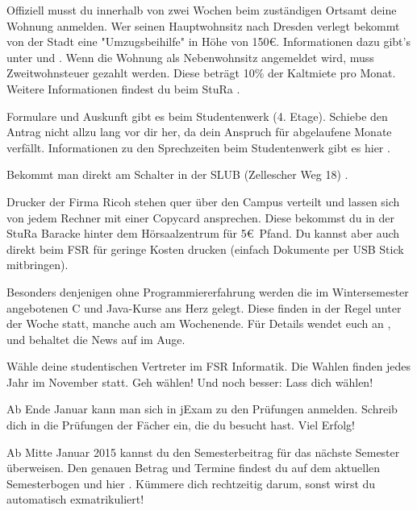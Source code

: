 Offiziell musst du innerhalb von zwei Wochen beim zuständigen Ortsamt  deine Wohnung anmelden.
Wer seinen Hauptwohnsitz nach Dresden verlegt bekommt von der Stadt eine "Umzugsbeihilfe" in Höhe von 150\euro.
Informationen dazu gibt's unter  und .
Wenn die Wohnung als Nebenwohnsitz angemeldet wird, muss Zweitwohnsteuer gezahlt werden. Diese beträgt 10\% der Kaltmiete pro Monat. Weitere Informationen findest du beim StuRa .

Formulare und Auskunft gibt es beim Studentenwerk (4. Etage).
Schiebe den Antrag nicht allzu lang vor dir her, da dein Anspruch für abgelaufene Monate verfällt.
Informationen zu den Sprechzeiten beim Studentenwerk gibt es hier .

Bekommt man direkt am Schalter in der SLUB (Zellescher Weg 18) .

Drucker der Firma Ricoh stehen quer über den Campus verteilt und lassen sich von jedem Rechner mit einer Copycard ansprechen.
Diese bekommst du in der StuRa Baracke hinter dem Hörsaalzentrum für 5\euro\ Pfand. Du kannst aber auch direkt beim FSR für geringe Kosten drucken (einfach Dokumente per USB Stick mitbringen).

Besonders denjenigen ohne Programmiererfahrung werden die im Wintersemester angebotenen C und Java-Kurse ans Herz gelegt.
Diese finden in der Regel unter der Woche statt, manche auch am Wochenende.
Für Details wendet euch an ,  und behaltet die News auf  im Auge.

Wähle deine studentischen Vertreter im FSR Informatik.
Die Wahlen finden jedes Jahr im November statt.
Geh wählen!
Und noch besser: Lass dich wählen!

Ab Ende Januar kann man sich in jExam zu den Prüfungen anmelden.
Schreib dich in die Prüfungen der Fächer ein, die du besucht hast.
Viel Erfolg!

Ab Mitte Januar 2015 kannst du den Semesterbeitrag für das nächste Semester überweisen.
Den genauen Betrag und Termine findest du auf dem aktuellen Semesterbogen und hier .
Kümmere dich rechtzeitig darum, sonst wirst du automatisch exmatrikuliert!

